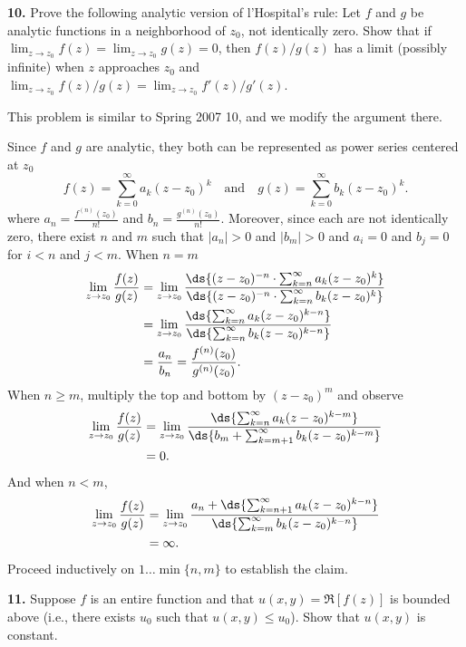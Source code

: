 \documentclass{homework}
\begin{document}
{\bf 10.} Prove the following analytic version of l'Hospital's rule: Let $f$ and $g$ be analytic functions in a neighborhood of $z_0$, not identically zero.  Show that if $\lim_{z\to z_0}f(z) = \lim_{z\to z_0}g(z) = 0$, then $f(z)/g(z)$ has a limit (possibly infinite) when $z$ approaches $z_0$ and $\lim_{z\to z_0}f(z)/g(z) = \lim_{z\to z_0} f'(z)/g'(z)$.

\begin{solution}
  This problem is similar to Spring 2007 10, and we modify the argument there.

  Since $f$ and $g$ are analytic, they both can be represented as power series centered at $z_0$
  $$
    f(z) = \sum_{k=0}^\infty a_k(z-z_0)^k\quad\text{and}\quad g(z)= \sum_{k=0}^\infty b_k(z-z_0)^k.
  $$
  where $a_n = \frac{ f^{(n)}(z_0) }{n!}$ and $b_n = \frac{ g^{(n)}(z_0) }{n!}$.
  Moreover, since each are not identically zero, there exist $n$ and $m$ such that $|a_n| > 0$ and $|b_m| > 0$ and $a_i = 0$ and $b_j = 0$ for $i<n$ and $j<m$.  When $n= m$
  \begin{align*}
    \lim_{z\to z_0}\frac{f(z)}{g(z)} 
    &= \lim_{z\to z_0} \frac{\ds{(z-z_0)^{-n} \cdot \sum_{k=n}^\infty a_k(z-z_0)^k}}{\ds{(z-z_0)^{-n} \cdot \sum_{k=n}^\infty b_k(z-z_0)^k}}\\
    &= \lim_{z\to z_0} \frac{\ds{\sum_{k=n}^\infty a_k(z-z_0)^{k-n}}}{\ds{\sum_{k=n}^\infty b_k(z-z_0)^{k-n}}}\\
    &= \frac{a_n}{b_n} = \frac{f^{(n)}(z_0)}{g^{(n)}(z_0)}.
  \end{align*}
  When $n \ge m$, multiply the top and bottom by $(z-z_0)^m$ and observe
  \begin{align*}
    \lim_{z\to z_0}\frac{f(z)}{g(z)} 
    &= \lim_{z\to z_0} \frac{\ds{\sum_{k=n}^\infty a_k(z-z_0)^{k-m}}}{\ds{b_m + \sum_{k=m+1}^\infty b_k(z-z_0)^{k-m}}}\\
    &= 0.
  \end{align*}
  And when $n < m$, 
  \begin{align*}
    \lim_{z\to z_0}\frac{f(z)}{g(z)} 
    &= \lim_{z\to z_0} \frac{a_n + \ds{\sum_{k=n+1}^\infty a_k(z-z_0)^{k-n}}}{\ds{\sum_{k=m}^\infty b_k(z-z_0)^{k-n}}}\\
    &= \infty.
  \end{align*}
  Proceed inductively on $1\dots \min\{n,m\}$ to establish the claim.
\end{solution}

{\bf 11.} Suppose $f$ is an entire function and that $u(x,y) = \Re[f(z)]$ is bounded above (i.e., there exists $u_0$ such that $u(x,y) \le u_0$).  Show that $u(x,y) $ is constant.
\end{document}

